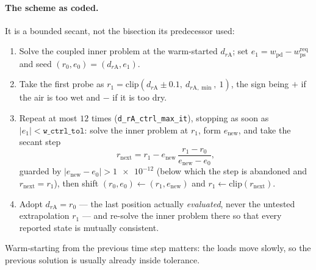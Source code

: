 \paragraph{The scheme as coded.} It is a bounded secant, not the bisection its
predecessor used:
\begin{enumerate}[nosep]
\item Solve the coupled inner problem at the warm-started
      $d_{r\mathrm{A}}$; set $e_1 = w_{\mathrm{pd}}-w_{\mathrm{ps}}^{\mathrm{req}}$
      and seed $(r_0,e_0)=(d_{r\mathrm{A}},e_1)$.
\item Take the first probe as $r_1 = \mathrm{clip}\!\left(d_{r\mathrm{A}}
      \pm \num{0.1},\ d_{r\mathrm{A},\min},\ 1\right)$, the sign being
      $+$ if the air is too wet and $-$ if it is too dry.
\item Repeat at most $\num{12}$ times (\texttt{d\_rA\_ctrl\_max\_it}),
      stopping as soon as $|e_1| < \texttt{w\_ctrl\_tol}$: solve the inner
      problem at $r_1$, form $e_{\mathrm{new}}$, and take the secant step
      \begin{equation}
      r_{\mathrm{next}} = r_1 - e_{\mathrm{new}}\,
      \frac{r_1-r_0}{e_{\mathrm{new}}-e_0},
      \label{eq:air:secant}
      \end{equation}
      guarded by $|e_{\mathrm{new}}-e_0|>\num{1e-12}$ (below which the step is
      abandoned and $r_{\mathrm{next}}=r_1$), then shift
      $(r_0,e_0)\leftarrow(r_1,e_{\mathrm{new}})$ and
      $r_1\leftarrow\mathrm{clip}(r_{\mathrm{next}})$.
\item Adopt $d_{r\mathrm{A}}=r_0$ --- the last position actually
      \emph{evaluated}, never the untested extrapolation $r_1$ --- and re-solve
      the inner problem there so that every reported state is mutually
      consistent.
\end{enumerate}
Warm-starting from the previous time step matters: the loads move slowly, so
the previous solution is usually already inside tolerance.

